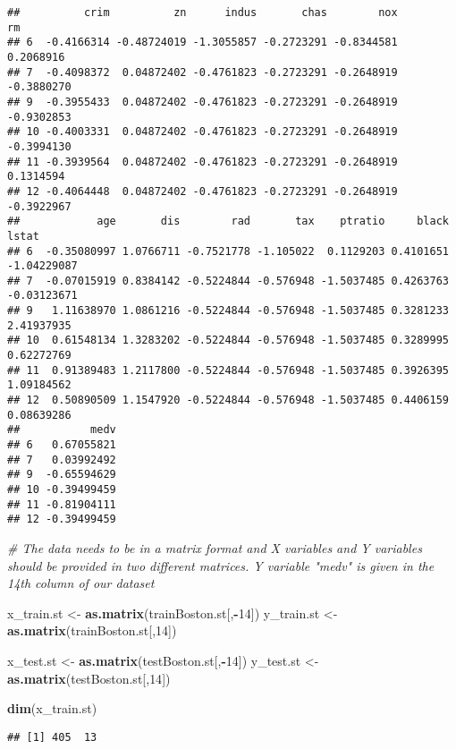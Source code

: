 \documentclass[
]{book}
\newenvironment{Shaded}{\begin{snugshade}}{\end{snugshade}}
\newcommand{\CommentTok}[1]{\textcolor[rgb]{0.56,0.35,0.01}{\textit{#1}}}
\newcommand{\DecValTok}[1]{\textcolor[rgb]{0.00,0.00,0.81}{#1}}
\newcommand{\KeywordTok}[1]{\textcolor[rgb]{0.13,0.29,0.53}{\textbf{#1}}}
\newcommand{\NormalTok}[1]{#1}
\newcommand{\OperatorTok}[1]{\textcolor[rgb]{0.81,0.36,0.00}{\textbf{#1}}}
\newcommand{\StringTok}[1]{\textcolor[rgb]{0.31,0.60,0.02}{#1}}
\begin{document}
\begin{verbatim}
##          crim          zn      indus       chas        nox         rm
## 6  -0.4166314 -0.48724019 -1.3055857 -0.2723291 -0.8344581  0.2068916
## 7  -0.4098372  0.04872402 -0.4761823 -0.2723291 -0.2648919 -0.3880270
## 9  -0.3955433  0.04872402 -0.4761823 -0.2723291 -0.2648919 -0.9302853
## 10 -0.4003331  0.04872402 -0.4761823 -0.2723291 -0.2648919 -0.3994130
## 11 -0.3939564  0.04872402 -0.4761823 -0.2723291 -0.2648919  0.1314594
## 12 -0.4064448  0.04872402 -0.4761823 -0.2723291 -0.2648919 -0.3922967
##            age       dis        rad       tax    ptratio     black       lstat
## 6  -0.35080997 1.0766711 -0.7521778 -1.105022  0.1129203 0.4101651 -1.04229087
## 7  -0.07015919 0.8384142 -0.5224844 -0.576948 -1.5037485 0.4263763 -0.03123671
## 9   1.11638970 1.0861216 -0.5224844 -0.576948 -1.5037485 0.3281233  2.41937935
## 10  0.61548134 1.3283202 -0.5224844 -0.576948 -1.5037485 0.3289995  0.62272769
## 11  0.91389483 1.2117800 -0.5224844 -0.576948 -1.5037485 0.3926395  1.09184562
## 12  0.50890509 1.1547920 -0.5224844 -0.576948 -1.5037485 0.4406159  0.08639286
##           medv
## 6   0.67055821
## 7   0.03992492
## 9  -0.65594629
## 10 -0.39499459
## 11 -0.81904111
## 12 -0.39499459
\end{verbatim}

\begin{Shaded}
\begin{Highlighting}[]
\CommentTok{# The data needs to be in a matrix format and X variables and Y variables should be provided in two different matrices. Y variable "medv" is given in the 14th column of our dataset}

\NormalTok{x_train.st <-}\StringTok{ }\KeywordTok{as.matrix}\NormalTok{(trainBoston.st[,}\OperatorTok{-}\DecValTok{14}\NormalTok{])}
\NormalTok{y_train.st <-}\StringTok{ }\KeywordTok{as.matrix}\NormalTok{(trainBoston.st[,}\DecValTok{14}\NormalTok{])}

\NormalTok{x_test.st <-}\StringTok{ }\KeywordTok{as.matrix}\NormalTok{(testBoston.st[,}\OperatorTok{-}\DecValTok{14}\NormalTok{])}
\NormalTok{y_test.st <-}\StringTok{ }\KeywordTok{as.matrix}\NormalTok{(testBoston.st[,}\DecValTok{14}\NormalTok{])}

\KeywordTok{dim}\NormalTok{(x_train.st)}
\end{Highlighting}
\end{Shaded}

\begin{verbatim}
## [1] 405  13
\end{verbatim}
\end{document}
